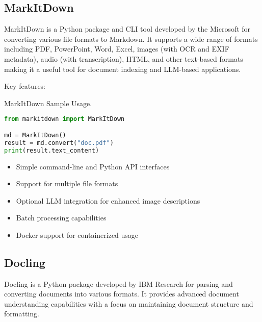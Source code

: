 \subsection{MarkItDown}

MarkItDown  is a Python package and CLI tool developed by the Microsoft for converting various file formats to Markdown. It supports a wide range of formats including PDF, PowerPoint, Word, Excel, images (with OCR and EXIF metadata), audio (with transcription), HTML, and other text-based formats making it a useful tool for document indexing and LLM-based applications.

Key features:
\begin{marginlisting}[-1.35cm]
	\caption{MarkItDown Sample Usage.}
    \label{lst:markitdown}
	\vspace{0.6cm}
	\begin{lstlisting}[language=Python,style=kaolstplain]
from markitdown import MarkItDown

md = MarkItDown()
result = md.convert("doc.pdf")
print(result.text_content)
	\end{lstlisting}
\end{marginlisting}
\begin{itemize}
    \item Simple command-line and Python API interfaces
    \item Support for multiple file formats
    \item Optional LLM integration for enhanced image descriptions
    \item Batch processing capabilities
    \item Docker support for containerized usage
\end{itemize}

\subsection{Docling}

Docling  is a Python package developed by IBM Research for parsing and converting documents into various formats. It provides advanced document understanding capabilities with a focus on maintaining document structure and formatting.


